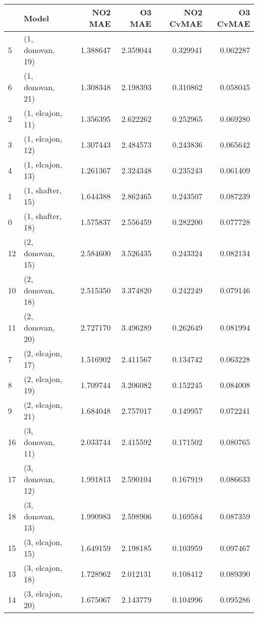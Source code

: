\begin{tabular}{llrrrr}
\toprule
{} &             Model &   NO2 MAE &    O3 MAE &  NO2 CvMAE &  O3 CvMAE \\
\midrule
5  &  (1, donovan, 19) &  1.388647 &  2.359044 &   0.329941 &  0.062287 \\
6  &  (1, donovan, 21) &  1.308348 &  2.198393 &   0.310862 &  0.058045 \\
2  &  (1, elcajon, 11) &  1.356395 &  2.622262 &   0.252965 &  0.069280 \\
3  &  (1, elcajon, 12) &  1.307443 &  2.484573 &   0.243836 &  0.065642 \\
4  &  (1, elcajon, 13) &  1.261367 &  2.324348 &   0.235243 &  0.061409 \\
1  &  (1, shafter, 15) &  1.644388 &  2.862465 &   0.243507 &  0.087239 \\
0  &  (1, shafter, 18) &  1.575837 &  2.556459 &   0.282200 &  0.077728 \\
12 &  (2, donovan, 15) &  2.584600 &  3.526435 &   0.243324 &  0.082134 \\
10 &  (2, donovan, 18) &  2.515350 &  3.374820 &   0.242249 &  0.079146 \\
11 &  (2, donovan, 20) &  2.727170 &  3.496289 &   0.262649 &  0.081994 \\
7  &  (2, elcajon, 17) &  1.516902 &  2.411567 &   0.134742 &  0.063228 \\
8  &  (2, elcajon, 19) &  1.709744 &  3.206082 &   0.152245 &  0.084008 \\
9  &  (2, elcajon, 21) &  1.684048 &  2.757017 &   0.149957 &  0.072241 \\
16 &  (3, donovan, 11) &  2.033744 &  2.415592 &   0.171502 &  0.080765 \\
17 &  (3, donovan, 12) &  1.991813 &  2.590104 &   0.167919 &  0.086633 \\
18 &  (3, donovan, 13) &  1.990983 &  2.598906 &   0.169584 &  0.087359 \\
15 &  (3, elcajon, 15) &  1.649159 &  2.198185 &   0.103959 &  0.097467 \\
13 &  (3, elcajon, 18) &  1.728962 &  2.012131 &   0.108412 &  0.089390 \\
14 &  (3, elcajon, 20) &  1.675067 &  2.143779 &   0.104996 &  0.095286 \\
\bottomrule
\end{tabular}
